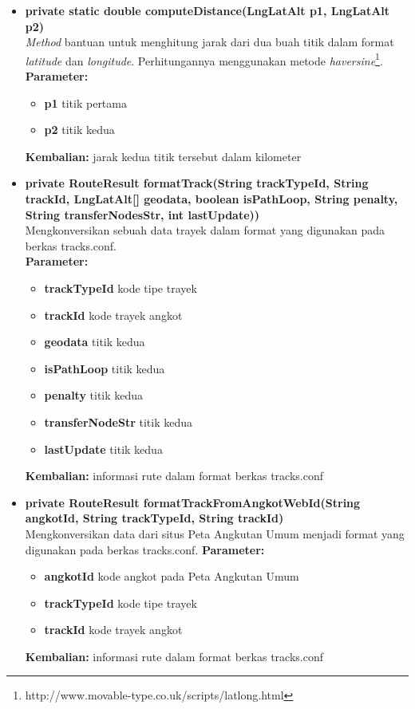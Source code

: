 \begin{itemize}
	\item \textbf{private static double computeDistance(LngLatAlt p1, LngLatAlt p2)} \\
		\textit{Method} bantuan untuk menghitung jarak dari dua buah titik dalam format \textit{latitude} dan \textit{longitude}. Perhitungannya menggunakan metode \textit{haversine}\footnote{http://www.movable-type.co.uk/scripts/latlong.html}.
		\textbf{Parameter:}
		\begin{itemize}
			\item \textbf{p1} titik pertama
			\item \textbf{p2} titik kedua
		\end{itemize}
		\textbf{Kembalian:} jarak kedua titik tersebut dalam kilometer
	\item \textbf{private RouteResult formatTrack(String trackTypeId, String trackId,
			LngLatAlt[] geodata, boolean isPathLoop, String penalty,
			String transferNodesStr, int lastUpdate))} \\
		Mengkonversikan sebuah data trayek dalam format yang digunakan pada berkas tracks.conf. \\
		\textbf{Parameter:}
		\begin{itemize}
			\item \textbf{trackTypeId} kode tipe trayek
			\item \textbf{trackId} kode trayek angkot
			\item \textbf{geodata} titik kedua
			\item \textbf{isPathLoop} titik kedua
			\item \textbf{penalty} titik kedua
			\item \textbf{transferNodeStr} titik kedua
			\item \textbf{lastUpdate} titik kedua
		\end{itemize}
		\textbf{Kembalian:} informasi rute dalam format berkas tracks.conf
	\item \textbf{private RouteResult formatTrackFromAngkotWebId(String angkotId, String trackTypeId, String trackId)} \\
		Mengkonversikan data dari situs Peta Angkutan Umum menjadi format yang digunakan pada berkas tracks.conf.
		\textbf{Parameter:}
		\begin{itemize}
			\item \textbf{angkotId} kode angkot pada Peta Angkutan Umum
			\item \textbf{trackTypeId} kode tipe trayek
			\item \textbf{trackId} kode trayek angkot
		\end{itemize}
		\textbf{Kembalian:} informasi rute dalam format berkas tracks.conf
\end{itemize}

